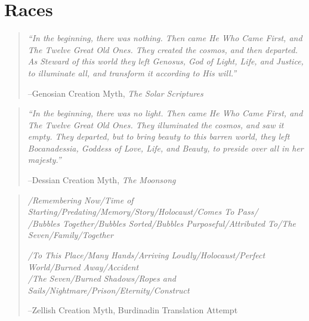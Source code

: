 \documentclass[oneside,11pt,english]{book}
\begin{document}
\chapter{Races}\label{ch:races}
\startcontents[chapters]
\clearpage
\begin{quote}
  \emph{``In the beginning, there was nothing. Then came He Who Came First, and
    The Twelve Great Old Ones. They created the cosmos, and then departed. As
    Steward of this world they left Genosus, God of Light, Life, and Justice, to
    illuminate all, and transform it according to His will.''}

  \hfill --Genosian Creation Myth, \textit{The Solar Scriptures}
\end{quote}
\begin{quote}
  \emph{``In the beginning, there was no light. Then came He Who Came First, and
    The Twelve Great Old Ones. They illuminated the cosmos, and saw it empty.
    They departed, but to bring beauty to this barren world, they left
    Bocanadessia, Goddess of Love, Life, and Beauty, to preside over all in her
    majesty.''}

  \hfill --Dessian Creation Myth, \textit{The Moonsong} 
\end{quote}
\begin{quotation}
  \emph{/Remembering Now/Time of Starting/Predating/Memory/Story/Holocaust/Comes To Pass/\\
    /Bubbles Together/Bubbles Sorted/Bubbles Purposeful/Attributed To/The Seven/Family/Together}

  \emph{/To This Place/Many Hands/Arriving Loudly/Holocaust/Perfect World/Burned Away/Accident\\
    /The Seven/Burned Shadows/Ropes and Sails/Nightmare/Prison/Eternity/Construct}

  \hfill --Zellish Creation Myth, Burdinadin Translation Attempt 
\end{quotation}
\end{document}

